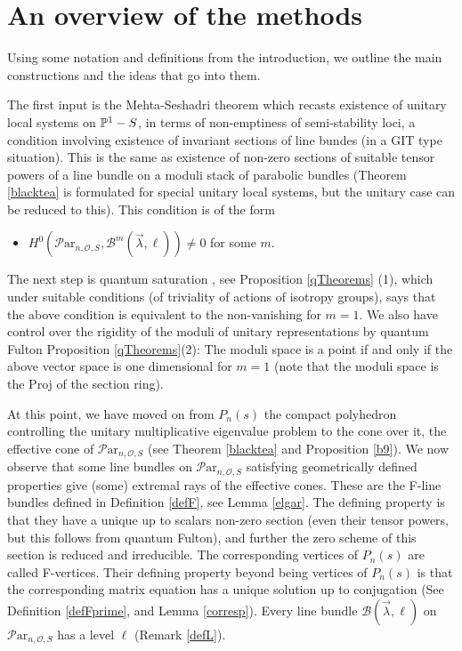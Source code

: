 \documentclass[11pt]{amsart}
\newcommand\Par{\mathcal{P}\text{ar} }
\numberwithin{theorem}{subsection}
\begin{document}
{\section{An overview of the methods}\label{uber}
Using  some notation and definitions from the introduction, we outline the main constructions and the ideas that go into them.

The first input is the Mehta-Seshadri theorem \cite{MS} which recasts existence of unitary local systems on $\Bbb{P}^1-S$, in terms of non-emptiness of semi-stability loci, a condition involving existence of invariant sections of line bundes (in a GIT type situation). This is the same as existence of  non-zero sections of suitable tensor powers of a line bundle on a moduli stack of parabolic bundles (Theorem \ref{blacktea} is formulated for special unitary local systems, but the unitary case can be reduced to this). This condition is of the form
\begin{itemize}
\item
$H^0(\Par_{n,\mathcal{O},S},\mathcal{B}^m(\vec{\lambda},\ell))\neq 0$ for some $m$.
\end{itemize}

The next step is quantum saturation \cite{BHorn}, see  Proposition \ref{qTheorems} (1), which under  suitable conditions (of triviality of actions of isotropy groups), says that the above condition is equivalent to the non-vanishing for $m=1$.
We also have control over the rigidity of the moduli of unitary representations by quantum Fulton Proposition \ref{qTheorems}(2):  The moduli space is a point if and only if the above vector space is one dimensional for $m=1$ (note that the moduli space is the Proj of the section ring).

At this point, we have moved on from $P_n(s)$ the compact polyhedron controlling the unitary multiplicative eigenvalue problem to the cone over it, the effective cone of $\Par_{n,\mathcal{O},S}$ (see Theorem \ref{blacktea} and Proposition \ref{b9}). We now observe that some line bundles on $\Par_{n,\mathcal{O},S}$ satisfying geometrically defined properties give (some) extremal rays of the effective cones. These are the  F-line bundles defined in Definition \ref{defF}, see Lemma \ref{elgar}. The defining property is that they have a unique up to scalars non-zero section (even their tensor powers, but this follows from quantum Fulton), and further the zero scheme of this section is reduced and irreducible. The corresponding vertices of $P_n(s)$ are called F-vertices. Their defining property beyond being vertices of $P_n(s)$ is that the corresponding matrix equation has a unique solution up to  conjugation (See Definition \ref{defFprime}, and Lemma \ref{corresp}). Every line bundle $\mathcal{B}(\vec{\lambda},\ell)$ on $\Par_{n,\mathcal{O},S}$ has a level $\ell$ (Remark \ref{defL}).

}
\end{document}
